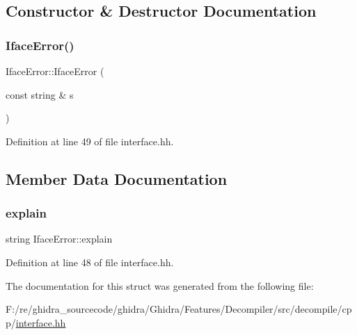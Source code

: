 \subsection{Constructor \& Destructor Documentation}
\mbox{\label{struct_iface_error_a93bb43a011b15405bc293c08f9ca834a}} 
\subsubsection{\texorpdfstring{IfaceError()}{IfaceError()}}
{\footnotesize\ttfamily Iface\+Error\+::\+Iface\+Error (\begin{DoxyParamCaption}\item[{const string \&}]{s }\end{DoxyParamCaption})\hspace{0.3cm}{\ttfamily [inline]}}



Definition at line 49 of file interface.\+hh.



\subsection{Member Data Documentation}
\mbox{\label{struct_iface_error_ab688dd18578c0ece6519447af6fd631d}} 
\subsubsection{\texorpdfstring{explain}{explain}}
{\footnotesize\ttfamily string Iface\+Error\+::explain}



Definition at line 48 of file interface.\+hh.



The documentation for this struct was generated from the following file\+:\begin{DoxyCompactItemize}
\item 
F\+:/re/ghidra\+\_\+sourcecode/ghidra/\+Ghidra/\+Features/\+Decompiler/src/decompile/cpp/\mbox{\hyperlink{interface_8hh}{interface.\+hh}}\end{DoxyCompactItemize}
